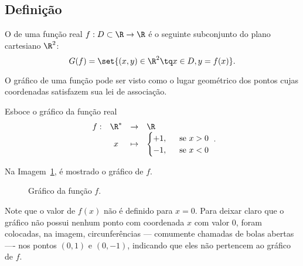 \subsection{Definição}

\begin{definition}
    O  de uma função real $f : D \subset \R \to \R$ é o seguinte subconjunto do plano
cartesiano $\R^2$: $$G(f) = \set{(x,y) \in \R^2 \tq x \in D , y =
f(x)}.$$
\end{definition}

\begin{remark}
    O gráfico de uma função pode ser visto como o lugar geométrico
dos pontos cujas coordenadas satisfazem sua lei de associação.
\end{remark}

\begin{example}
    Esboce o gráfico da função real
    $$\begin{array}{cccl}
    f : & \R^\ast & \to     & \R \\
        &  x & \mapsto & \begin{cases}
                            +1,  &  \ \text{ se } x >0 \\
                            -1, &  \ \text{ se } x <0
                            \end{cases}
    \end{array}.$$
\end{example}

\begin{solution}
    Na Imagem~\ref{img:grafico-funcao-zeroum}, é mostrado o gráfico de $f$.

    \begin{figure}[ht]
    \centering
    \caption{Gráfico da função $f$.}
    \label{img:grafico-funcao-zeroum}
    \end{figure}

    Note que o valor de $f(x)$ não é definido para $x=0$.
    Para deixar claro que o gráfico não possui nenhum ponto com coordenada $x$ com valor $0$, foram colocadas, na imagem, circunferências --- comumente chamadas de bolas abertas ---- nos pontos $(0,1)$ e $(0,-1)$, indicando que eles não pertencem ao gráfico de $f$.
\end{solution}